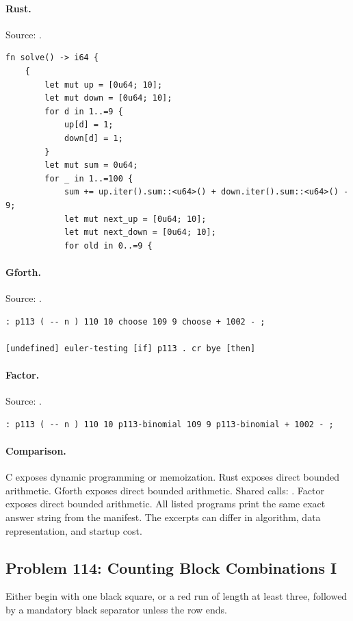 \paragraph{Rust.} Source: .
\begin{lstlisting}
fn solve() -> i64 {
    {
        let mut up = [0u64; 10];
        let mut down = [0u64; 10];
        for d in 1..=9 {
            up[d] = 1;
            down[d] = 1;
        }
        let mut sum = 0u64;
        for _ in 1..=100 {
            sum += up.iter().sum::<u64>() + down.iter().sum::<u64>() - 9;
            let mut next_up = [0u64; 10];
            let mut next_down = [0u64; 10];
            for old in 0..=9 {
\end{lstlisting}

\paragraph{Gforth.} Source: .
\begin{lstlisting}
: p113 ( -- n ) 110 10 choose 109 9 choose + 1002 - ;

[undefined] euler-testing [if] p113 . cr bye [then]
\end{lstlisting}

\paragraph{Factor.} Source: .
\begin{lstlisting}
: p113 ( -- n ) 110 10 p113-binomial 109 9 p113-binomial + 1002 - ;
\end{lstlisting}

\paragraph{Comparison.}
C exposes dynamic programming or memoization. Rust exposes direct bounded arithmetic. Gforth exposes direct bounded arithmetic. Shared calls: \texttt{}. Factor exposes direct bounded arithmetic.
All listed programs print the same exact answer string from the manifest. The excerpts can differ in algorithm, data representation, and startup cost.

\subsection{Problem 114: Counting Block Combinations I}
\label{walkthrough:p114}
Either begin with one black square, or a red run of length at least three, followed by a mandatory black separator unless the row ends.


